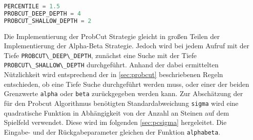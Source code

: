 \begin{lstlisting}[language=Python]
PERCENTILE = 1.5
PROBCUT_DEEP_DEPTH = 4
PROBCUT_SHALLOW_DEPTH = 2
\end{lstlisting}

Die Implementierung der ProbCut Strategie gleicht in großen Teilen der
Implementierung der Alpha-Beta Strategie. Jedoch wird bei jedem Aufruf
mit der Tiefe \passthrough{\lstinline!PROBCUT\_DEEP\_DEPTH!}, zunächst
eine Suche mit der Tiefe
\passthrough{\lstinline!PROBCUT\_SHALLOW\_DEPTH!} durchgeführt. Anhand
der dabei ermittelten Nützlichkeit wird entsprechend der in
\autoref{sec:probcut} beschriebenen Regeln entschieden, ob eine Tiefe
Suche durchgeführt werden muss, oder einer der beiden Grenzwerte
\passthrough{\lstinline!alpha!} oder \passthrough{\lstinline!beta!}
zurückgegeben werden kann. Zur Abschätzung der für den Probcut
Algorithmus benötigten Standardabweichung
\passthrough{\lstinline!sigma!} wird eine quadratische Funktion in
Abhängigkeit von der Anzahl an Steinen auf dem Spielfeld verwendet.
Diese wird im folgenden \autoref{sec:pcsigma} hergeleitet. Die Eingabe-
und der Rückgabeparameter gleichen der Funktion
\passthrough{\lstinline!alphabeta!}.

